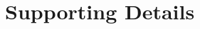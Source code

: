 \documentclass[aspectratio=169,xcolor=dvipsnames,8pt]{beamer}
\begin{document}
\section{Supporting Details}
\end{document}
